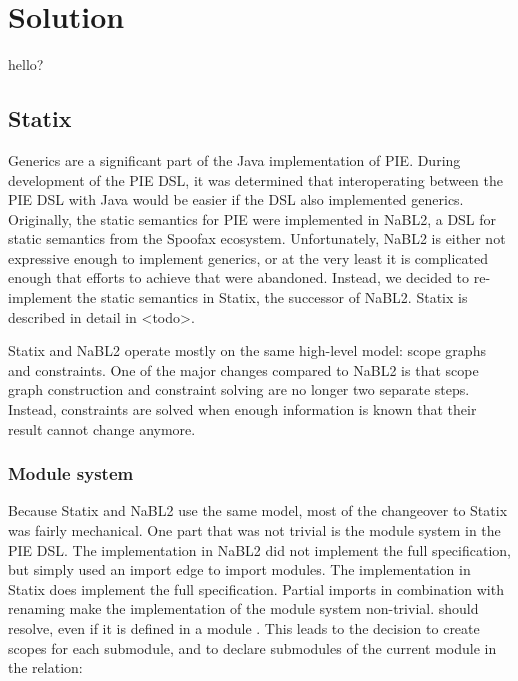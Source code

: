 \chapter{\label{chap:solution}Solution}

hello?

\section{\label{sec:solution__statix}Statix}
Generics are a significant part of the Java implementation of \ac{PIE}.
During development of the \ac{PIE} \ac{DSL}, it was determined that interoperating between the \ac{PIE} \ac{DSL} with Java would be easier if the \ac{DSL} also implemented generics.
Originally, the static semantics for \ac{PIE} were implemented in NaBL2, a \ac{DSL} for static semantics from the Spoofax ecosystem.
Unfortunately, \ac{NaBL2} is either not expressive enough to implement generics, or at the very least it is complicated enough that efforts to achieve that were abandoned. 
Instead, we decided to re-implement  the static semantics in Statix, the successor of \ac{NaBL2}.
Statix is described in detail in <todo>.

Statix and \ac{NaBL2} operate mostly on the same high-level model: scope graphs and constraints.
One of the major changes compared to \ac{NaBL2} is that scope graph construction and constraint solving are no longer two separate steps.
Instead, constraints are solved when enough information is known that their result cannot change anymore.

\subsection{\label{subsec:solution__statix__module_system}Module system}
Because Statix and \ac{NaBL2} use the same model, most of the changeover to Statix was fairly mechanical.
One part that was not trivial is the module system in the \ac{PIE} \ac{DSL}.
The implementation in \ac{NaBL2} did not implement the full specification, but simply used an import edge to import modules. 
The implementation in Statix does implement the full specification.
Partial imports  in combination with renaming make the implementation of the module system non-trivial.
 should resolve, even if it is defined in a module .
This leads to the decision to create scopes for each submodule, and to declare submodules of the current module in the  relation:

